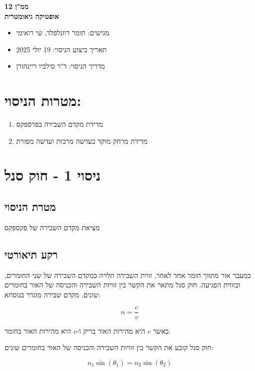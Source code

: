 \documentclass[14pt]{extarticle}
\begin{document}
\begin{center}
    {\LARGE \textbf{ממ"ן 12}}\\
    {\textbf{אופטיקה גיאומטרית}}
\end{center}

\begin{itemize}
    \item מגישים: תומר רוזנלפלד, שי רואימי
    \item תאריך ביצוע הניסוי: 19 יולי 2025
    \item מדריך הניסוי: ד"ר סילביו ריינהורן
\end{itemize}

\section*{מטרות הניסוי:}
\begin{enumerate}
    \item מדידת מקדם השבירה בפרספקס
    \item מדידת מרחק מוקד בעדשה מרכזת ועדשה מפזרת
\end{enumerate}

\section*{ניסוי 1 - חוק סנל}
\subsection*{מטרת הניסוי}
מציאת מקדם השבירה של פקספקס 

\subsection*{רקע תיאורטי}
במעבר אור מתווך חומר אחד לאחר, זווית השבירה תלויה במקדם השבירה של שני החומרים, ובזווית הפגיעה.
חוק סנל מתאר את הקשר בין זוויות השבירה והכניסה של האור בחומרים שונים.
מקדם שבירה מוגדר בנוסחא:

\begin{equation}
    n = \frac{c}{v}
\end{equation}

כאשר $c$ היא מהירות האור בריק ו-$v$ היא מהירות האור בחומר.


חוק סנל קובע את הקשר בין זוויות השבירה והכניסה של האור בחומרים שונים:

\begin{equation}
n_1 \sin(\theta_1) = n_2 \sin(\theta_2)
\end{equation}
\end{document}
